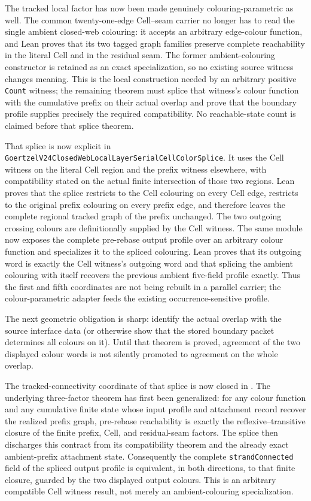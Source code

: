 \documentclass[11pt]{article}
\theoremstyle{definition}
\begin{document}
The tracked local factor has now been made genuinely colouring-parametric as
well.  The common twenty-one-edge Cell--seam carrier no longer has to read the
single ambient closed-web colouring: it accepts an arbitrary edge-colour
function, and Lean proves that its two tagged graph families preserve complete
reachability in the literal Cell and in the residual seam.  The former
ambient-colouring constructor is retained as an exact specialization, so no
existing source witness changes meaning.  This is the local construction
needed by an arbitrary positive \texttt{Count} witness; the remaining theorem
must splice that witness's colour function with the cumulative prefix on their
actual overlap and prove that the boundary profile supplies precisely the
required compatibility.  No reachable-state count is claimed before that
splice theorem.

That splice is now explicit in
\texttt{GoertzelV24ClosedWebLocalLayerSerialCellColorSplice}.  It uses the
Cell witness on the literal Cell region and the prefix witness elsewhere,
with compatibility stated on the actual finite intersection of those two
regions.  Lean proves that the splice restricts to the Cell colouring on every
Cell edge, restricts to the original prefix colouring on every prefix edge,
and therefore leaves the complete regional tracked graph of the prefix
unchanged.  The two outgoing crossing colours are definitionally supplied by
the Cell witness.  The same module now exposes the complete pre-rebase output
profile over an arbitrary colour function and specializes it to the spliced
colouring.  Lean proves that its outgoing word is exactly the Cell witness's
outgoing word and that splicing the ambient colouring with itself recovers the
previous ambient five-field profile exactly.  Thus the first and fifth
coordinates are not being rebuilt in a parallel carrier; the colour-parametric
adapter feeds the existing occurrence-sensitive profile.

The next geometric obligation is sharp: identify the actual
overlap with the source interface data (or otherwise show that the stored
boundary packet determines all colours on it).  Until that theorem is proved,
agreement of the two displayed colour words is not silently promoted to
agreement on the whole overlap.

The tracked-connectivity coordinate of that splice is now closed in
.
The underlying three-factor theorem has first been generalized: for any
colour function and any cumulative finite state whose input profile and
attachment record recover the realized prefix graph, pre-rebase reachability
is exactly the reflexive--transitive closure of the finite prefix, Cell, and
residual-seam factors.  The splice then discharges this contract from its
compatibility theorem and the already exact ambient-prefix attachment state.
Consequently the complete \texttt{strandConnected} field of the spliced output
profile is equivalent, in both directions, to that finite closure, guarded by
the two displayed output colours.  This is an arbitrary compatible Cell
witness result, not merely an ambient-colouring specialization.
\end{document}
